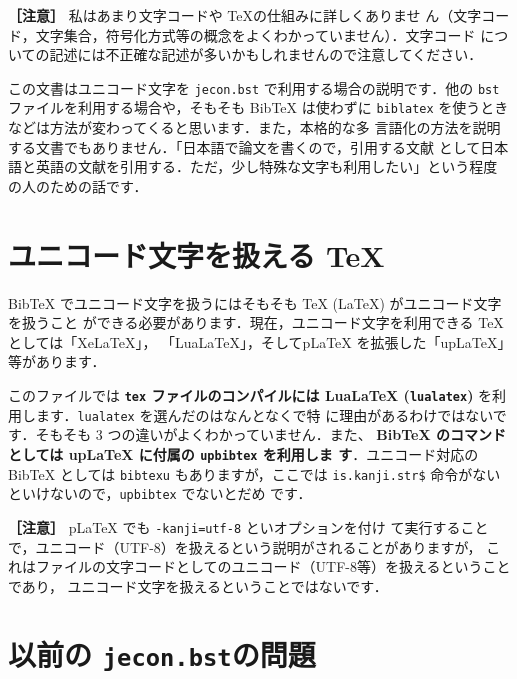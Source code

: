\documentclass{ltjsarticle}
\begin{document}
\vspace*{1em}

\noindent \textbf{［注意］} 私はあまり文字コードや \TeX の仕組みに詳しくありませ
ん（文字コード，文字集合，符号化方式等の概念をよくわかっていません）．文字コード
についての記述には不正確な記述が多いかもしれませんので注意してください．

\vspace*{1em}

この文書はユニコード文字を \texttt{jecon.bst} で利用する場合の説明です．他の
\texttt{bst} ファイルを利用する場合や，そもそも BibTeX は使わずに
\texttt{biblatex} を使うときなどは方法が変わってくると思います．また，本格的な多
言語化の方法を説明する文書でもありません．「日本語で論文を書くので，引用する文献
として日本語と英語の文献を引用する．ただ，少し特殊な文字も利用したい」という程度
の人のための話です．


\section{ユニコード文字を扱える \TeX}

BibTeX でユニコード文字を扱うにはそもそも TeX (LaTeX) がユニコード文字を扱うこと
ができる必要があります．現在，ユニコード文字を利用できる TeX としては「XeLaTeX」，
「LuaLaTeX」，そしてpLaTeX を拡張した「upLaTeX」等があります．

このファイルでは \textbf{\texttt{tex} ファイルのコンパイルには LuaLaTeX
(\texttt{lualatex}) }を利用します．\texttt{lualatex} を選んだのはなんとなくで特
に理由があるわけではないです．そもそも 3 つの違いがよくわかっていません．また、
\textbf{BibTeX のコマンドとしては upLaTeX に付属の \texttt{upbibtex} を利用しま
す}．ユニコード対応の BibTeX としては \texttt{bibtexu} もありますが，ここでは
\texttt{is.kanji.str\$} 命令がないといけないので，\texttt{upbibtex} でないとだめ
です．

\vspace*{1em}

\noindent \textbf{［注意］} pLaTeX でも \verb|-kanji=utf-8| といオプションを付け
て実行することで，ユニコード（UTF-8）を扱えるという説明がされることがありますが，
これはファイルの文字コードとしてのユニコード（UTF-8等）を扱えるということであり，
ユニコード文字を扱えるということではないです．

\section{以前の \texttt{jecon.bst}の問題}
\label{jecon-problem}
\end{document}
